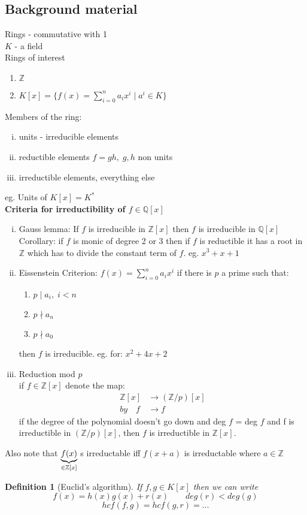 \documentclass[12pt]{article}
\def\QQ{\mathbb{Q}}
\def\ZZ{\mathbb{Z}}
\newtheorem{definition}{Definition}[section]
\begin{document}
\subsection{Background material}
Rings - commutative with 1\\
$K$ - a field\\
Rings of interest
\begin{enumerate}
\item $\ZZ$
\item $K[x] = \{f(x) = \sum_{i=0}^{n}a_{i}x^{i} \; | \; a^i \in K\}$
\end{enumerate}
Members of the ring:
\begin{enumerate}[(i)]
\item units - irreducible elements
\item reductible elements $f = gh, \; g,h$ non units
\item irreductible elements, everything else
\end{enumerate}
eg. Units of $K[x] = K^*$\\

\textbf{Criteria for irreductibility of $f \in \QQ[x]$}
\begin{enumerate}[(i)]
\item Gauss lemma: If $f$ is irreducible in $\ZZ [x]$ then $f$ is irreducible in $\QQ [x]$\\
Corollary: if $f$ is monic of degree 2 or 3 then if $f$ is reductible it has a root in $\ZZ$ which has to divide the constant term of $f$. eg. $x^3 + x +1$ \\
\item Eissenstein Criterion: $f(x) = \sum_{i=0}^{n}a_{i}x^{i}$ if there is $p$ a prime such that:
\begin{enumerate}
\item $p\mid a_i, \; i < n$
\item $p\nmid a_n$
\item $p\nmid a_0$
\end{enumerate}
then $f$ is irreducible. eg. for: $x^2 + 4x + 2$
\item Reduction mod $p$\\
if $f \in \ZZ [x]$ denote the map:
\begin{align*}
\ZZ[x] & \rightarrow (\ZZ / p)[x] \\
by \quad f & \rightarrow f
\end{align*}
if the degree of the polynomial doesn't go down and deg $f$ = deg $f$ and f is irreductible in $(\ZZ / p)[x]$, then $f$ is irreductible in $\ZZ [x]$.\\
\end{enumerate}
Also note that $\underbrace{f(x)}_{\mathclap{\in \ZZ [x]}}$ s irreductable iff $f(x+a)$ is irreductable where $a \in \ZZ$\\
\begin{definition}[Euclid's algorithm]
If $f,g \in K[x]$ then we can write 
\[f(x) = h(x)g(x) + r(x) \qquad deg(r) < deg(g)\]
\[hcf(f,g) = hcf(g,r)= \dots \]
\end{definition}
\end{document}
